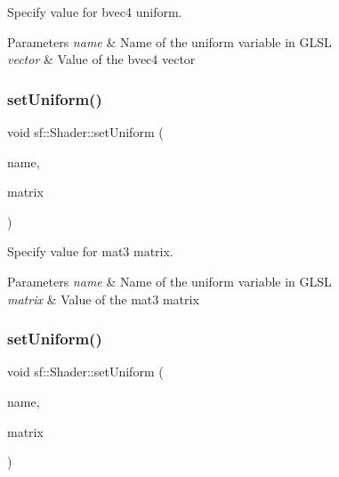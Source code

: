 Specify value for {\ttfamily bvec4} uniform. 


\begin{DoxyParams}{Parameters}
{\em name} & Name of the uniform variable in G\+L\+SL \\
\hline
{\em vector} & Value of the bvec4 vector \\
\hline
\end{DoxyParams}
\mbox{\label{classsf_1_1_shader_ac1198ae0152d439bc05781046883e281}} 
\subsubsection{\texorpdfstring{set\+Uniform()}{setUniform()}\hspace{0.1cm}{\footnotesize\ttfamily [13/16]}}
{\footnotesize\ttfamily void sf\+::\+Shader\+::set\+Uniform (\begin{DoxyParamCaption}\item[{const std\+::string \&}]{name,  }\item[{const \hyperlink{structsf_1_1priv_1_1_matrix}{Glsl\+::\+Mat3} \&}]{matrix }\end{DoxyParamCaption})}



Specify value for {\ttfamily mat3} matrix. 


\begin{DoxyParams}{Parameters}
{\em name} & Name of the uniform variable in G\+L\+SL \\
\hline
{\em matrix} & Value of the mat3 matrix \\
\hline
\end{DoxyParams}
\mbox{\label{classsf_1_1_shader_aca5c55c4a3b23d21e33dbdaab7990755}} 
\subsubsection{\texorpdfstring{set\+Uniform()}{setUniform()}\hspace{0.1cm}{\footnotesize\ttfamily [14/16]}}
{\footnotesize\ttfamily void sf\+::\+Shader\+::set\+Uniform (\begin{DoxyParamCaption}\item[{const std\+::string \&}]{name,  }\item[{const \hyperlink{structsf_1_1priv_1_1_matrix}{Glsl\+::\+Mat4} \&}]{matrix }\end{DoxyParamCaption})}



